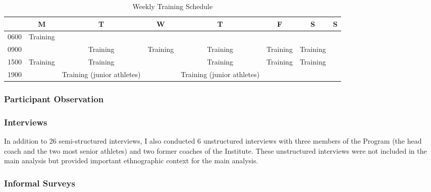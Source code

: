   \begin{landscape}
    \begin{table}[htpb]\caption{Weekly Training Schedule}
      \begin{center}
        \begin{small}
            \begin{tabular}{| c | c | c | c | c | c | c | c |}
              \hline
              & \bf M & \bf T & \bf W & \bf T & \bf F & \bf S & \bf S \\
              \hline
              0600 & Training &  &  & & & & \\
              \hline
              0900 &  & Training & Training & Training & Training & Training &  \\
                \hline
              1500 & Training & Training & & Training & Training & Training &  \\
                \hline
              1900 &  & Training (junior athletes) & & Training (junior athletes) & & & \\
                 \hline
            \end{tabular}
                \label{tab:tournamentData}
          \end{small}
        \end{center}
      \end{table}
  \end{landscape}
  \restoregeometry




\subsubsection{Participant Observation}

  \subsubsection{Interviews}

  In addition to 26 semi-structured interviews, I also conducted 6 unstructured interviews with three members of the Program (the head coach and the two most senior athletes) and two former coaches of the Institute.  These unstructured interviews were not included in the main analysis but provided important ethnographic context for the main analysis.

  \subsubsection{Informal Surveys}

